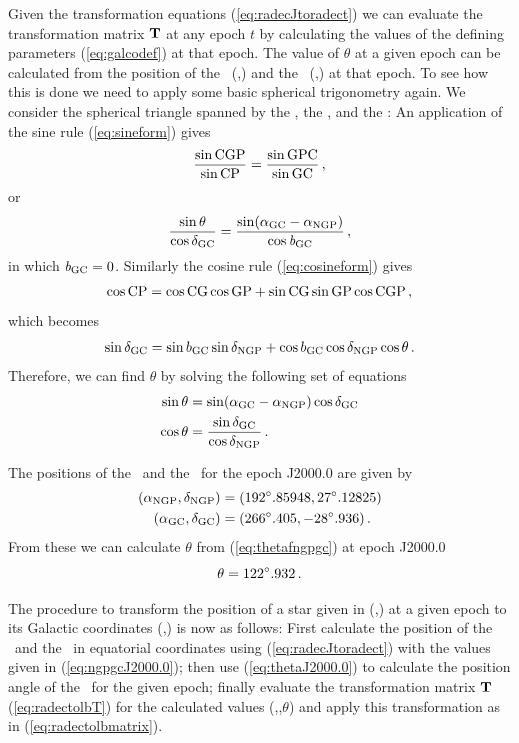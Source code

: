 Given the transformation equations (\ref{eq:radecJtoradect}) we can
evaluate the transformation matrix $\mathbf{T}$ at any epoch $t$ by
calculating the values of the defining parameters (\ref{eq:galcodef})
at that epoch. The value of $\theta$ at a given epoch can be
calculated from the position of the \ngp\ (\rangp,\decngp) and the \gc\
(\ragc,\decgc) at that epoch. To see how this is done we need to apply
some basic spherical trigonometry again. We consider the spherical
triangle spanned by the \ngp, the \gc, and the \ncp: An application of
the sine rule (\ref{eq:sineform}) gives
\begin{equation}
\frac{\sin \textnormal{C} \textnormal{G} \textnormal{P}}{\sin \textnormal{C} \textnormal{P}} = \frac{\sin \textnormal{G} \textnormal{P} \textnormal{C}}{\sin \textnormal{G} \textnormal{C}}\, ,
\end{equation}
or
\begin{equation}
\frac{\sin \theta}{\cos \delta_{\textnormal{GC}}} = \frac{\sin(\alpha_{\textnormal{GC}} -\alpha_{\textnormal{NGP}})}{\cos {\it b}_{\textnormal{GC}}}\, ,
\end{equation}
in which ${\it b}_{\textnormal{GC}} = 0$. Similarly the cosine rule (\ref{eq:cosineform}) gives
\begin{equation}
\cos \textnormal{C} \textnormal{P} = \cos \textnormal{C} \textnormal{G} \cos \textnormal{G} \textnormal{P} + \sin \textnormal{C} \textnormal{G} \sin \textnormal{G} \textnormal{P} \cos \textnormal{C} \textnormal{G} \textnormal{P}\, ,
\end{equation}
which becomes
\begin{equation}
\sin \delta_{\textnormal{GC}} = \sin b_{\textnormal{GC}} \sin \delta_{\textnormal{NGP}} + \cos b_{\textnormal{GC}} \cos \delta_{\textnormal{NGP}}  \cos \theta\, .
\end{equation}
Therefore, we can find $\theta$ by solving the following set of equations
\begin{align}\label{eq:thetafngpgc}
\sin \theta & = \sin(\alpha_{\textnormal{GC}} - \alpha_{\textnormal{NGP}})\cos \delta_{\textnormal{GC}}\\
\cos \theta &= \frac{\sin \delta_{\textnormal{GC}}}{\cos\delta_{\textnormal{NGP}}}\, .
\end{align}

The positions of the \ngp\ and the \gc\ for the epoch J2000.0 are
given by \citep[]{1998gaas.book.....B}
\begin{align}
(\alpha_{\textnormal{NGP}},\delta_{\textnormal{NGP}}) & = (192^{\circ}.85948,27^{\circ}.12825)\nonumber\\
(\alpha_{\textnormal{GC}}, \delta_{\textnormal{GC}}) &= (266^{\circ}.405,-28^{\circ}.936)\, \label{eq:ngpgcJ2000.0}.
\end{align}
From these we can calculate $\theta$ from (\ref{eq:thetafngpgc}) at
epoch J2000.0
\begin{equation}\label{eq:thetaJ2000.0}
\theta = 122^{\circ}.932\, .
\end{equation}

The procedure to transform the position of a star given in (\ra,\dec)
at a given epoch to its Galactic coordinates (\gall,\galb) is now as
follows: First calculate the position of the \ngp\ and the \gc\ in
equatorial coordinates using (\ref{eq:radecJtoradect}) with the values
given in (\ref{eq:ngpgcJ2000.0}); then use (\ref{eq:thetaJ2000.0}) to
calculate the position angle of the \gc\ for the given epoch; finally
evaluate the transformation matrix $\mathbf{T}$ (\ref{eq:radectolbT}) for the
calculated values (\rangp,\decngp,$\theta$) and apply this
transformation as in (\ref{eq:radectolbmatrix}).



